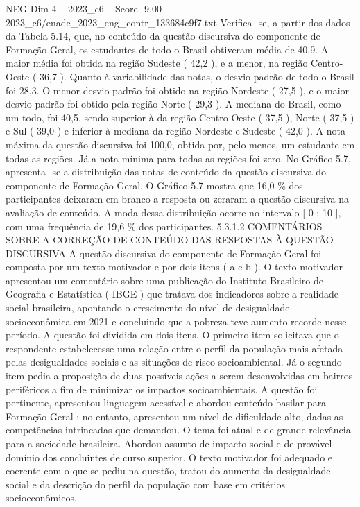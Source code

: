 \begin{textsample}{NEG Dim 4 – 2023\_c6 – Score -9.00 – 2023\_c6/enade\_2023\_eng\_contr\_133684c9f7.txt}
Verifica -se, a partir dos dados da Tabela 5.14, que, no conteúdo da questão discursiva do componente de Formação Geral, os estudantes de todo o Brasil obtiveram média de 40,9.
A maior média foi obtida na região Sudeste ( 42,2 ), e a menor, na região Centro-Oeste ( 36,7 ).
Quanto à variabilidade das notas, o desvio-padrão de todo o Brasil foi 28,3.
O menor desvio-padrão foi obtido na região Nordeste ( 27,5 ), e o maior desvio-padrão foi obtido pela região Norte ( 29,3 ).
A mediana do Brasil, como um todo, foi 40,5, sendo superior à da região Centro-Oeste ( 37,5 ), Norte ( 37,5 ) e Sul ( 39,0 ) e inferior à mediana da região Nordeste e Sudeste ( 42,0 ).
A nota máxima da questão discursiva foi 100,0, obtida por, pelo menos, um estudante em todas as regiões.
Já a nota mínima para todas as regiões foi zero.
No Gráfico 5.7, apresenta -se a distribuição das notas de conteúdo da questão discursiva do componente de Formação Geral.
O Gráfico 5.7 mostra que 16,0 \% dos participantes deixaram em branco a resposta ou zeraram a questão discursiva na avaliação de conteúdo.
A moda dessa distribuição ocorre no intervalo [ 0 ; 10 ], com uma frequência de 19,6 \% dos participantes. 5.3.1.2 COMENTÁRIOS SOBRE A CORREÇÃO DE CONTEÚDO DAS RESPOSTAS À QUESTÃO DISCURSIVA A questão discursiva do componente de Formação Geral foi composta por um texto motivador e por dois itens ( a e b ).
O texto motivador apresentou um comentário sobre uma publicação do Instituto Brasileiro de Geografia e Estatística ( IBGE ) que tratava dos indicadores sobre a realidade social brasileira, apontando o crescimento do nível de desigualdade socioeconômica em 2021 e concluindo que a pobreza teve aumento recorde nesse período.
A questão foi dividida em dois itens.
O primeiro item solicitava que o respondente estabelecesse uma relação entre o perfil da população mais afetada pelas desigualdades sociais e as situações de risco socioambiental.
Já o segundo item pedia a proposição de duas possíveis ações a serem desenvolvidas em bairros periféricos a fim de minimizar os impactos socioambientais.
A questão foi pertinente, apresentou linguagem acessível e abordou conteúdo basilar para Formação Geral ; no entanto, apresentou um nível de dificuldade alto, dadas as competências intrincadas que demandou.
O tema foi atual e de grande relevância para a sociedade brasileira.
Abordou assunto de impacto social e de provável domínio dos concluintes de curso superior.
O texto motivador foi adequado e coerente com o que se pediu na questão, tratou do aumento da desigualdade social e da descrição do perfil da população com base em critérios socioeconômicos.

\end{textsample}
